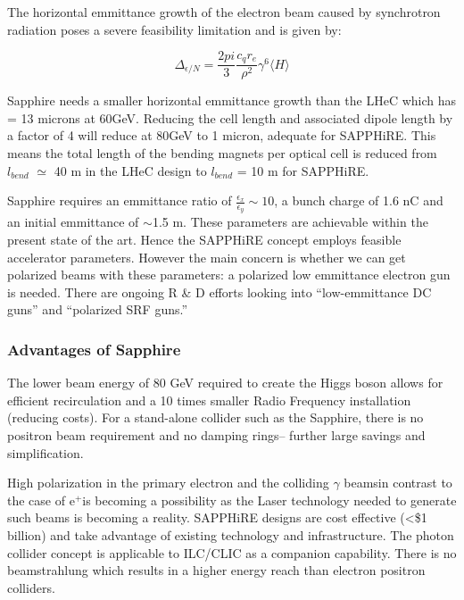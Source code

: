 The horizontal emmittance growth of the electron beam caused by synchrotron radiation poses a severe feasibility limitation and is given by:

\begin{equation}
\Delta_{\epsilon/N}=\frac{2pi}{3}\frac{c_{q}r_{e}}{\rho^{2}}\gamma^{6}\langle H \rangle
\end{equation}

Sapphire needs a smaller horizontal emmittance growth than the LHeC which has  = 13 microns at 60GeV.  Reducing the cell length and associated dipole length by a factor of 4 will reduce  at 80GeV to 1 micron, adequate for SAPPHiRE. This means the total length of the bending magnets per optical cell is reduced from $l_{bend}$ $\simeq$ 40 m in the LHeC design to $l_{bend}$ = 10 m for SAPPHiRE\cite{Bogacz:SAPPHiRE}.

Sapphire requires an emmittance ratio of $\frac{\epsilon_{x}}{\epsilon_{y}} \sim 10$, a bunch charge of 1.6 nC and an initial emmittance of $\sim$1.5 \textmu m. These parameters are achievable within the present state of the art. Hence the SAPPHiRE concept employs feasible accelerator parameters. However the main concern is whether we can get polarized beams with these parameters: a polarized low emmittance electron gun is needed. There are ongoing R \& D efforts looking into ``low-emmittance DC guns'' and ``polarized SRF guns.''\cite{Zimmermann:SAPPHiRE}

\subsubsection{Advantages of Sapphire}                                                                                                              The lower beam energy of 80 GeV required to create the Higgs boson allows for efficient recirculation and a 10 times smaller Radio Frequency installation (reducing costs)\cite{Bogacz:SAPPHiRE}. For a stand-alone collider such as the Sapphire, there is no positron beam requirement and no damping rings– further large savings and simplification.

High polarization in the primary electron and the colliding $\gamma$ beams\textemdash in contrast to the case of e$^{+}$\textemdash is becoming a possibility as the Laser technology needed to generate such beams is becoming a reality. SAPPHiRE designs are cost effective (\textless \$1 billion) and take advantage of existing technology and infrastructure. The photon collider concept is applicable to ILC/CLIC as a companion capability. There is no beamstrahlung which results in a higher energy reach than electron positron colliders\cite{Zimmermann:SAPPHiRE}.

